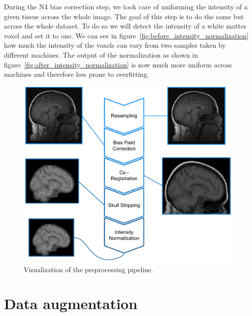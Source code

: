 During the N4 bias correction step, we took care of uniforming the intensity of a given tissue across the whole image. The goal of this step is to do the same but across the whole dataset. To do so we will detect the intensity of a white matter voxel and set it to one. We can see in figure~\ref{fig:before_intensity_normalization} how much the intensity of the voxels can vary from two samples taken by different machines. The output of the normalization as shown in figure~\ref{fig:after_intensity_normalization} is now much more uniform across machines and therefore less prone to overfitting.

\begin{figure}
    \centering
    \includegraphics[width=1.0\textwidth]{figures/preprocessing/pipeline.pdf}
    \caption{Visualization of the preprocessing pipeline.}
    \label{fig:pipeline}
\end{figure}


\section{Data augmentation}

